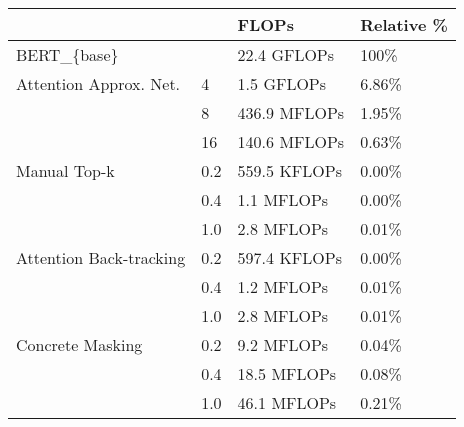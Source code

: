 \begin{tabular}{llll}
\toprule
                 &     &         FLOPs & Relative \% \\
\midrule
BERT\_\{base\} & {} &   22.4 GFLOPs &       100\% \\
Attention Approx. Net. & 4 &    1.5 GFLOPs &      6.86\% \\
                 & 8 &  436.9 MFLOPs &      1.95\% \\
                 & 16 &  140.6 MFLOPs &      0.63\% \\
Manual Top-k & 0.2 &  559.5 KFLOPs &      0.00\% \\
                 & 0.4 &    1.1 MFLOPs &      0.00\% \\
                 & 1.0 &    2.8 MFLOPs &      0.01\% \\
Attention Back-tracking & 0.2 &  597.4 KFLOPs &      0.00\% \\
                 & 0.4 &    1.2 MFLOPs &      0.01\% \\
                 & 1.0 &    2.8 MFLOPs &      0.01\% \\
Concrete Masking & 0.2 &    9.2 MFLOPs &      0.04\% \\
                 & 0.4 &   18.5 MFLOPs &      0.08\% \\
                 & 1.0 &   46.1 MFLOPs &      0.21\% \\
\bottomrule
\end{tabular}
